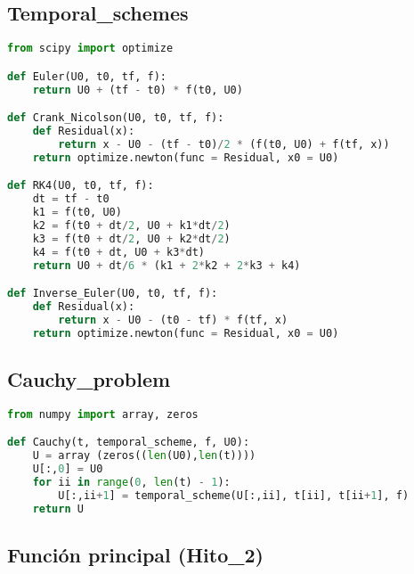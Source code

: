 
\subsection{Temporal\_schemes}

\begin{lstlisting}[language=Python, caption=Código de la función Temporal\_schemes, label=Hito_2_Temporal_schemes_code]
from scipy import optimize

def Euler(U0, t0, tf, f):
    return U0 + (tf - t0) * f(t0, U0)

def Crank_Nicolson(U0, t0, tf, f):
    def Residual(x):
        return x - U0 - (tf - t0)/2 * (f(t0, U0) + f(tf, x))
    return optimize.newton(func = Residual, x0 = U0)

def RK4(U0, t0, tf, f):
    dt = tf - t0
    k1 = f(t0, U0)
    k2 = f(t0 + dt/2, U0 + k1*dt/2)
    k3 = f(t0 + dt/2, U0 + k2*dt/2)
    k4 = f(t0 + dt, U0 + k3*dt)
    return U0 + dt/6 * (k1 + 2*k2 + 2*k3 + k4)

def Inverse_Euler(U0, t0, tf, f):
    def Residual(x):
        return x - U0 - (t0 - tf) * f(tf, x)
    return optimize.newton(func = Residual, x0 = U0)

\end{lstlisting}

\subsection{Cauchy\_problem}

\begin{lstlisting}[language=Python, caption=Código de la función Cauchy\_problem, label=Hito_2_Cauchy_problem_code]
from numpy import array, zeros

def Cauchy(t, temporal_scheme, f, U0):
    U = array (zeros((len(U0),len(t))))
    U[:,0] = U0
    for ii in range(0, len(t) - 1):
        U[:,ii+1] = temporal_scheme(U[:,ii], t[ii], t[ii+1], f)
    return U

\end{lstlisting}

\subsection{Función principal (Hito\_2)}

